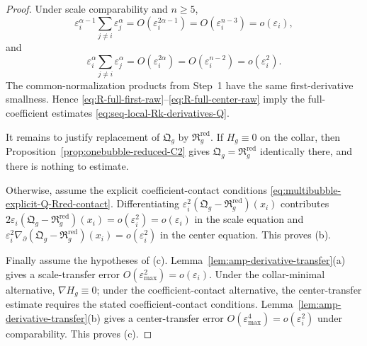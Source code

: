 \documentclass[11pt,reqno,a4paper]{amsart}
\numberwithin{equation}{section}
\theoremstyle{plain}
\theoremstyle{remark}
\theoremstyle{plain}
\begin{document}
\begin{proof}
Under scale comparability and $n\ge5$,
\[
\varepsilon_i^{\alpha-1}\sum_{j\ne i}\varepsilon_j^\alpha
=O(\varepsilon_i^{2\alpha-1})=O(\varepsilon_i^{n-3})=o(\varepsilon_i),
\]
and
\[
\varepsilon_i^\alpha\sum_{j\ne i}\varepsilon_j^\alpha
=O(\varepsilon_i^{2\alpha})=O(\varepsilon_i^{n-2})=o(\varepsilon_i^2).
\]
The common-normalization products from Step~1 have the same first-derivative smallness.  Hence
\eqref{eq:R-full-first-raw}--\eqref{eq:R-full-center-raw} imply the full-coefficient estimates
\eqref{eq:seq-local-Rk-derivatives-Q}.

It remains to justify replacement of $\mathfrak Q_g$ by
$\mathfrak R_g^{\mathrm{red}}$.  If $H_g\equiv0$ on the collar, then
Proposition~\ref{prop:onebubble-reduced-C2} gives
$\mathfrak Q_g=\mathfrak R_g^{\mathrm{red}}$ identically there, and there is
nothing to estimate.

Otherwise, assume the explicit coefficient-contact conditions
\eqref{eq:multibubble-explicit-Q-Rred-contact}.  Differentiating
$\varepsilon_i^2(\mathfrak Q_g-\mathfrak R_g^{\mathrm{red}})(x_i)$
contributes
$2\varepsilon_i(\mathfrak Q_g-\mathfrak R_g^{\mathrm{red}})(x_i)
=o(\varepsilon_i^2)=o(\varepsilon_i)$ in the scale equation and
$\varepsilon_i^2\nabla_\partial(\mathfrak Q_g-\mathfrak R_g^{\mathrm{red}})(x_i)
=o(\varepsilon_i^2)$ in the center equation.
This proves \textup{(b)}.

Finally assume the hypotheses of \textup{(c)}.  Lemma~\ref{lem:amp-derivative-transfer}\textup{(a)} gives a
scale-transfer error $O(\varepsilon_{\max}^2)=o(\varepsilon_i)$.  Under the
collar-minimal alternative, $\nabla H_g\equiv0$; under the
coefficient-contact alternative, the center-transfer estimate requires
the stated coefficient-contact conditions.
Lemma~\ref{lem:amp-derivative-transfer}\textup{(b)} gives a center-transfer error
$O(\varepsilon_{\max}^4)=o(\varepsilon_i^2)$ under comparability.  This proves \textup{(c)}.
\end{proof}
\end{document}
